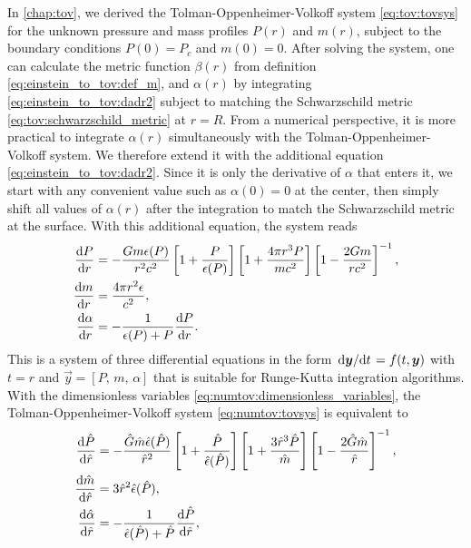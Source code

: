 In \cref{chap:tov}, we derived the Tolman-Oppenheimer-Volkoff system \eqref{eq:tov:tovsys} for the unknown pressure and mass profiles $P(r)$ and $m(r)$, subject to the boundary conditions $P(0) = P_c$ and $m(0) = 0$.
After solving the system, one can calculate the metric function $\beta(r)$ from definition \eqref{eq:einstein_to_tov:def_m}, and $\alpha(r)$ by integrating \cref{eq:einstein_to_tov:dadr2} subject to matching the Schwarzschild metric \eqref{eq:tov:schwarzschild_metric} at $r=R$.
From a numerical perspective, it is more practical to integrate $\alpha(r)$ simultaneously with the Tolman-Oppenheimer-Volkoff system.
We therefore extend it with the additional equation \eqref{eq:einstein_to_tov:dadr2}.
Since it is only the derivative of $\alpha$ that enters it, we start with any convenient value such as $\alpha(0) = 0$ at the center, then simply shift all values of $\alpha(r)$ after the integration to match the Schwarzschild metric at the surface.
With this additional equation, the system reads
\begin{subequations}
\label{eq:numtov:tovsys}
\begin{align}
	\odv{P}{r} &= -\frac{G m \epsilon(P)}{r^2 c^2} \left[ 1 + \frac{P}{\epsilon(P)} \right] \left[ 1 + \frac{4 \pi r^3 P}{m c^2} \right] \left[ 1 - \frac{2 G m}{r c^2} \right]^{-1} , \label{eq:numtov:tov_pressure} \\
	\odv{m}{r} &= \frac{4 \pi r^2 \epsilon}{c^2} , \label{eq:numtov:tov_mass} \\
	\odv{\alpha}{r} &= -\frac{1}{\epsilon(P) + P} \odv{P}{r} . \label{eq:numtov:tov_alpha}
\end{align}
\end{subequations}
This is a system of three differential equations in the form $\odv{\vec{y}}/{t} = f(t, \vec{y})$ with $t=r$ and $\vec{y} = [P,\, m,\, \alpha]$ that is suitable for Runge-Kutta integration algorithms.
With the dimensionless variables \eqref{eq:numtov:dimensionless_variables}, the Tolman-Oppenheimer-Volkoff system \eqref{eq:numtov:tovsys} is equivalent to
\begin{subequations}
\label{eq:numtov:tovsys_dimless_simple}
\begin{align}
	\odv{\diml{P}}{\diml{r}} &= - \frac{\diml{G} \diml{m} \diml{\epsilon}(\diml{P})}{\diml{r}^2} \left[ 1 + \frac{\diml{P}}{\diml{\epsilon}(\diml{P})} \right] \left[ 1 + \frac{3 \diml{r}^3 \diml{P}}{\diml{m}} \right] \left[ 1 - \frac{2 \diml{G} \diml{m}}{\diml{r}} \right]^{-1} , \\
	\odv{\diml{m}}{\diml{r}} &= 3 \diml{r}^2 \diml{\epsilon}(\diml{P}) , \\
	\odv{\diml{\alpha}}{\diml{r}} &= -\frac{1}{\diml{\epsilon}(\diml{P})+\diml{P}} \odv{\diml{P}}{\diml{r}} ,
\end{align}
\end{subequations}
